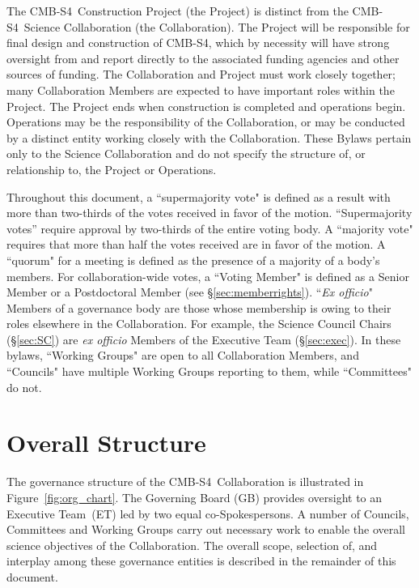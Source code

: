 \documentclass[12pt]{article}
\newcommand{\exec}{{Executive Team}}
\newcommand\collabname{CMB-S4}
\begin{document}
The \collabname\ Construction Project (the Project) is distinct from the \collabname\ Science Collaboration (the Collaboration). The Project will be responsible for final design and construction of \collabname, which by necessity will have strong oversight from and  report directly to the associated funding agencies and other sources of funding.  The Collaboration and Project must work closely together; many Collaboration Members are expected to have important roles within the Project. The Project ends when construction is completed and operations begin. Operations may be the responsibility of the Collaboration, or may be conducted by a distinct entity working closely with the Collaboration. These Bylaws pertain only to the Science Collaboration and do not specify the structure of, or relationship to, the Project or Operations. 
\vskip 12pt


Throughout this document,  a ``supermajority vote" is defined as a result with more than two-thirds of the votes received in favor of  the motion. \textcolor{\markcolor}{``Supermajority votes'' require approval by two-thirds of the entire voting body.} A ``majority vote" requires that more than half the votes received are in favor of the motion.   A ``quorum" for a meeting is defined as the presence of a majority of a body's members.   For collaboration-wide votes, a ``Voting Member" is  defined as a Senior Member or a Postdoctoral Member (see \S\ref{sec:memberrights}). ``{\it Ex officio}" Members of a governance body are those whose membership is owing to their roles elsewhere in the Collaboration.  For example, the Science Council Chairs (\S\ref{sec:SC}) are {\it ex officio} Members of the Executive Team (\S\ref{sec:exec}).  In these bylaws,  ``Working Groups" are open to all Collaboration Members, and ``Councils" have multiple Working Groups reporting to them, while ``Committees" do not.  





\section{Overall Structure}
The governance structure of the \collabname\ Collaboration  is illustrated in Figure~\ref{fig:org_chart}.  The Governing Board (GB) provides oversight to an \exec\ (ET) led by two equal co-Spokespersons.  A number of Councils, Committees and Working Groups carry out necessary work to enable the overall science objectives of the Collaboration. The overall scope, selection of, and interplay among these governance entities is described in the remainder of this document. 
\end{document}
